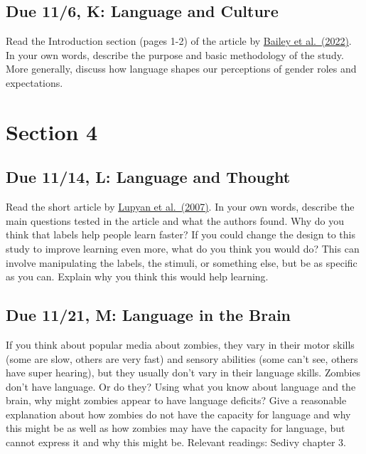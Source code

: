 \documentclass[
  letterpaper,
  DIV=11,
  numbers=noendperiod]{scrreprt}
\begin{document}
\hypertarget{due-116-k-language-and-culture}{%
\subsection*{Due 11/6, K: Language and
Culture}\label{due-116-k-language-and-culture}}

Read the Introduction section (pages 1-2) of the article by
\href{papers/Baileyetal2022.pdf}{Bailey et al.~(2022)}. In your own
words, describe the purpose and basic methodology of the study. More
generally, discuss how language shapes our perceptions of gender roles
and expectations.

\hypertarget{section-4}{%
\section*{\texorpdfstring{{Section 4}}{Section 4}}\label{section-4}}


\hypertarget{due-1114-l-language-and-thought}{%
\subsection*{Due 11/14, L: Language and
Thought}\label{due-1114-l-language-and-thought}}

Read the short article by \href{papers/Lupyanetal2007.pdf}{Lupyan et
al.~(2007)}. In your own words, describe the main questions tested in
the article and what the authors found. Why do you think that labels
help people learn faster? If you could change the design to this study
to improve learning even more, what do you think you would do? This can
involve manipulating the labels, the stimuli, or something else, but be
as specific as you can. Explain why you think this would help learning.

\hypertarget{due-1121-m-language-in-the-brain}{%
\subsection*{Due 11/21, M: Language in the
Brain}\label{due-1121-m-language-in-the-brain}}

If you think about popular media about zombies, they vary in their motor
skills (some are slow, others are very fast) and sensory abilities (some
can't see, others have super hearing), but they usually don't vary in
their language skills. Zombies don't have language. Or do they? Using
what you know about language and the brain, why might zombies appear to
have language deficits? Give a reasonable explanation about how zombies
do not have the capacity for language and why this might be as well as
how zombies may have the capacity for language, but cannot express it
and why this might be. Relevant readings: Sedivy chapter 3.
\end{document}

